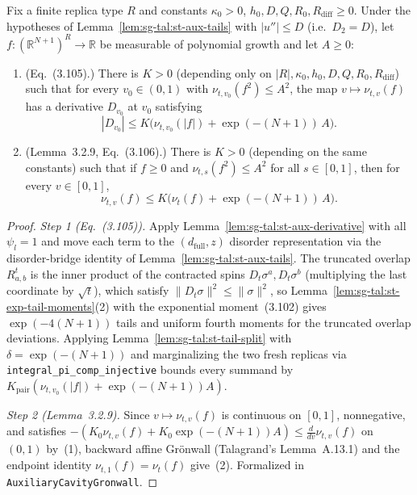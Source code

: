 \begin{lemma}\label{lem:sg-tal:st-aux-gronwall}
  \leanok
Fix a finite replica type $R$ and constants $\kappa_0>0$, $h_0,D,Q,R_0,R_{\mathrm{diff}}\ge0$. Under the
hypotheses of Lemma~\ref{lem:sg-tal:st-aux-tails} with $|u''|\le D$ (i.e.\ $D_2=D$), let
$f:(\mathbb R^{N+1})^R\to\mathbb R$ be measurable of polynomial growth and let $A\ge0$:
\begin{enumerate}
\item (Eq.~(3.105).) There is $K>0$ (depending only on $|R|,\kappa_0,h_0,D,Q,R_0,R_{\mathrm{diff}}$) such
that for every $v_0\in(0,1)$ with $\nu_{t,v_0}(f^2)\le A^2$, the map $v\mapsto\nu_{t,v}(f)$ has a derivative
$D_{v_0}$ at $v_0$ satisfying
\[
|D_{v_0}|\le K\bigl(\nu_{t,v_0}(|f|)+\exp(-(N+1))\,A\bigr).
\]
\item (Lemma~3.2.9, Eq.~(3.106).) There is $K>0$ (depending on the same constants) such that if $f\ge0$ and
$\nu_{t,s}(f^2)\le A^2$ for all $s\in[0,1]$, then for every $v\in[0,1]$,
\[
\nu_{t,v}(f)\le K\bigl(\nu_t(f)+\exp(-(N+1))\,A\bigr).
\]
\end{enumerate}
\end{lemma}
\begin{proof}
  \leanok
\emph{Step 1 (Eq.~(3.105)).} Apply Lemma~\ref{lem:sg-tal:st-aux-derivative} with all $\psi_l=1$ and move each
term to the $(d_{\mathrm{full}},z)$ disorder representation via the disorder-bridge identity of
Lemma~\ref{lem:sg-tal:st-aux-tails}. The truncated overlap $R^t_{a,b}$ is the inner
product of the contracted spins $D_t\sigma^a,D_t\sigma^b$ (multiplying the last coordinate by $\sqrt t$), which
satisfy $\|D_t\sigma\|^2\le\|\sigma\|^2$, so Lemma~\ref{lem:sg-tal:st-exp-tail-moments}(2) with the
exponential moment~(3.102) gives $\exp(-4(N+1))$ tails and uniform fourth moments for the truncated overlap
deviations. Applying Lemma~\ref{lem:sg-tal:st-tail-split} with $\delta=\exp(-(N+1))$ and marginalizing the
two fresh replicas via \texttt{integral\_pi\_comp\_injective} bounds every summand by
$K_{\mathrm{pair}}(\nu_{t,v_0}(|f|)+\exp(-(N+1))A)$.

\emph{Step 2 (Lemma~3.2.9).} Since $v\mapsto\nu_{t,v}(f)$ is continuous on $[0,1]$, nonnegative, and satisfies
$-(K_0\nu_{t,v}(f)+K_0\exp(-(N+1))A)\le\frac{d}{dv}\nu_{t,v}(f)$ on $(0,1)$ by~(1), backward affine
Gr\"onwall (Talagrand's Lemma~A.13.1) and the endpoint identity $\nu_{t,1}(f)=\nu_t(f)$ give~(2).
Formalized in \texttt{AuxiliaryCavityGronwall}.
\end{proof}

